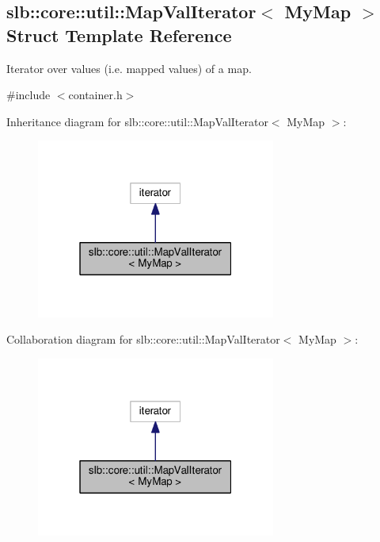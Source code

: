 \hypertarget{structslb_1_1core_1_1util_1_1MapValIterator}{}\subsection{slb\+:\+:core\+:\+:util\+:\+:Map\+Val\+Iterator$<$ My\+Map $>$ Struct Template Reference}
\label{structslb_1_1core_1_1util_1_1MapValIterator}


Iterator over values (i.\+e. mapped values) of a map.  




{\ttfamily \#include $<$container.\+h$>$}



Inheritance diagram for slb\+:\+:core\+:\+:util\+:\+:Map\+Val\+Iterator$<$ My\+Map $>$\+:\nopagebreak
\begin{figure}[H]
\begin{center}
\leavevmode
\includegraphics[width=223pt]{structslb_1_1core_1_1util_1_1MapValIterator__inherit__graph}
\end{center}
\end{figure}


Collaboration diagram for slb\+:\+:core\+:\+:util\+:\+:Map\+Val\+Iterator$<$ My\+Map $>$\+:\nopagebreak
\begin{figure}[H]
\begin{center}
\leavevmode
\includegraphics[width=223pt]{structslb_1_1core_1_1util_1_1MapValIterator__coll__graph}
\end{center}
\end{figure}
